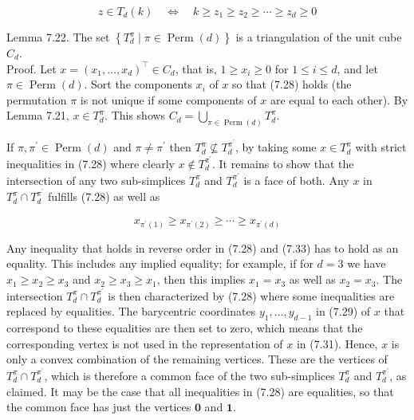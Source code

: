 \documentclass[12pt]{article}
\begin{document}
\begin{equation*}
z \in T_{d}(k) \quad \Leftrightarrow \quad k \geq z_{1} \geq z_{2} \geq \cdots \geq z_{d} \geq 0 \tag{7.32}
\end{equation*}


Lemma 7.22. The set $\left\{T_{d}^{\pi} \mid \pi \in \operatorname{Perm}(d)\right\}$ is a triangulation of the unit cube $C_{d}$.\\
Proof. Let $x=\left(x_{1}, \ldots, x_{d}\right)^{\top} \in C_{d}$, that is, $1 \geq x_{i} \geq 0$ for $1 \leq i \leq d$, and let $\pi \in \operatorname{Perm}(d)$. Sort the components $x_{i}$ of $x$ so that (7.28) holds (the permutation $\pi$ is not unique if some components of $x$ are equal to each other). By Lemma 7.21, $x \in T_{d}^{\pi}$. This shows $C_{d}=\bigcup_{\pi \in \operatorname{Perm}(d)} T_{d}^{\pi}$.

If $\pi, \pi^{\prime} \in \operatorname{Perm}(d)$ and $\pi \neq \pi^{\prime}$ then $T_{d}^{\pi} \nsubseteq T_{d}^{\pi^{\prime}}$, by taking some $x \in T_{d}^{\pi}$ with strict inequalities in (7.28) where clearly $x \notin T_{d}^{\pi^{\prime}}$. It remains to show that the intersection of any two sub-simplices $T_{d}^{\pi}$ and $T_{d}^{\pi^{\prime}}$ is a face of both. Any $x$ in $T_{d}^{\pi} \cap T_{d}^{\pi^{\prime}}$ fulfills (7.28) as well as


\begin{equation*}
x_{\pi^{\prime}(1)} \geq x_{\pi^{\prime}(2)} \geq \cdots \geq x_{\pi^{\prime}(d)} \tag{7.33}
\end{equation*}


Any inequality that holds in reverse order in (7.28) and (7.33) has to hold as an equality. This includes any implied equality; for example, if for $d=3$ we have $x_{1} \geq x_{2} \geq x_{3}$ and $x_{2} \geq x_{3} \geq x_{1}$, then this implies $x_{1}=x_{3}$ as well as $x_{2}=x_{3}$. The intersection $T_{d}^{\pi} \cap T_{d}^{\pi^{\prime}}$ is then characterized by (7.28) where some inequalities are replaced by equalities. The barycentric coordinates $y_{1}, \ldots, y_{d-1}$ in (7.29) of $x$ that correspond to these equalities are then set to zero, which means that the corresponding vertex is not used in the representation of $x$ in (7.31). Hence, $x$ is only a convex combination of the remaining vertices. These are the vertices of $T_{d}^{\pi} \cap T_{d}^{\pi^{\prime}}$, which is therefore a common face of the two sub-simplices $T_{d}^{\pi}$ and $T_{d}^{\pi^{\prime}}$, as claimed. It may be the case that all inequalities in (7.28) are equalities, so that the common face has just the vertices $\mathbf{0}$ and $\mathbf{1}$.
\end{document}
